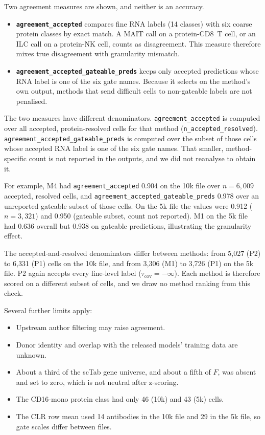 \documentclass[11pt]{article}
\begin{document}
Two agreement measures are shown, and neither is an accuracy.
\begin{itemize}
\item \textbf{\nolinkurl{agreement_accepted}} compares fine RNA labels (14 classes) with six coarse protein classes by exact match. A MAIT call on a protein-CD8~T cell, or an ILC call on a protein-NK cell, counts as disagreement. This measure therefore mixes true disagreement with granularity mismatch.
\item \textbf{\nolinkurl{agreement_accepted_gateable_preds}} keeps only accepted predictions whose RNA label is one of the six gate names. Because it selects on the method's own output, methods that send difficult cells to non-gateable labels are not penalised.
\end{itemize}

\noindent The two measures have different denominators. \nolinkurl{agreement_accepted} is computed over all accepted, protein-resolved cells for that method (\nolinkurl{n_accepted_resolved}). \nolinkurl{agreement_accepted_gateable_preds} is computed over the subset of those cells whose accepted RNA label is one of the six gate names. That smaller, method-specific count is not reported in the outputs, and we did not reanalyse to obtain it.

For example, M4 had \nolinkurl{agreement_accepted} 0.904 on the 10k file over $n=6{,}009$ accepted, resolved cells, and \nolinkurl{agreement_accepted_gateable_preds} 0.978 over an unreported gateable subset of those cells. On the 5k file the values were 0.912 ($n=3{,}321$) and 0.950 (gateable subset, count not reported). M1 on the 5k file had 0.636 overall but 0.938 on gateable predictions, illustrating the granularity effect.

The accepted-and-resolved denominators differ between methods: from 5{,}027 (P2) to 6{,}331 (P1) cells on the 10k file, and from 3{,}306 (M1) to 3{,}726 (P1) on the 5k file. P2 again accepts every fine-level label ($\tau_\mathrm{cov}=-\infty$). Each method is therefore scored on a different subset of cells, and we draw no method ranking from this check.

Several further limits apply:
\begin{itemize}
\item Upstream author filtering may raise agreement.
\item Donor identity and overlap with the released models' training data are unknown.
\item About a third of the scTab gene universe, and about a fifth of $F$, was absent and set to zero, which is not neutral after z-scoring.
\item The CD16-mono protein class had only 46 (10k) and 43 (5k) cells.
\item The CLR row mean used 14 antibodies in the 10k file and 29 in the 5k file, so gate scales differ between files.
\end{itemize}
\end{document}
